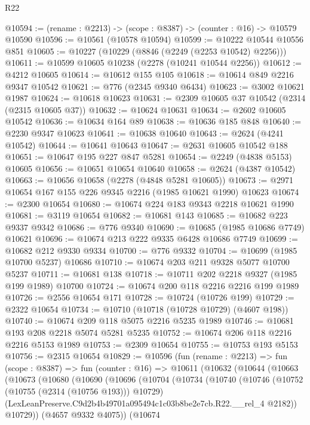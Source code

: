 \begin{lexlean}{R22}
\begin{coremodule}
@10594 := (rename : @2213) -> (scope : @8387) -> (counter : @16) -> @10579 @10590
@10596 := @10561 (@10578 @10594)
@10599 := @10222 @10544 @10556 @851
@10605 := @10227 (@10229 (@8846 (@2249 (@2253 @10542) @2256)))
@10611 := @10599 @10605 @10238 (@2278 (@10241 @10544 @2256))
@10612 := @4212 @10605
@10614 := @10612 @155 @105
@10618 := @10614 @849 @2216 @9347 @10542
@10621 := @776 (@2345 @9340 @6434)
@10623 := @3002 @10621 @1987
@10624 := @10618 @10623
@10631 := @2309 @10605 @37 @10542 (@2314 (@2315 @10605 @37))
@10632 := @10624 @10631
@10634 := @2602 @10605 @10542
@10636 := @10634 @164 @89
@10638 := @10636 @185 @848
@10640 := @2230 @9347 @10623
@10641 := @10638 @10640
@10643 := @2624 (@4241 @10542)
@10644 := @10641 @10643
@10647 := @2631 @10605 @10542 @188
@10651 := @10647 @195 @227 @847 @5281
@10654 := @2249 (@4838 @5153) @10605
@10656 := @10651 @10654 @10640
@10658 := @2624 (@4387 @10542)
@10663 := @10656 @10658 (@2278 (@4848 @5281 @10605))
@10673 := @2971 @10654 @167 @155 @226 @9345 @2216 (@1985 @10621 @1990) @10623
@10674 := @2300 @10654
@10680 := @10674 @224 @183 @9343 @2218 @10621 @1990
@10681 := @3119 @10654
@10682 := @10681 @143
@10685 := @10682 @223 @9337 @9342
@10686 := @776 @9340
@10690 := @10685 (@1985 @10686 @7749) @10621
@10696 := @10674 @213 @222 @9335 @6428 @10686 @7749
@10699 := @10682 @212 @9330 @9334
@10700 := @776 @9332
@10704 := @10699 (@1985 @10700 @5237) @10686
@10710 := @10674 @203 @211 @9328 @5077 @10700 @5237
@10711 := @10681 @138
@10718 := @10711 @202 @2218 @9327 (@1985 @199 @1989) @10700
@10724 := @10674 @200 @118 @2216 @2216 @199 @1989
@10726 := @2556 @10654 @171
@10728 := @10724 (@10726 @199)
@10729 := @2322 @10654
@10734 := @10710 (@10718 (@10728 @10729) (@4607 @198))
@10740 := @10674 @209 @118 @5075 @2216 @5235 @1989
@10746 := @10681 @193 @208 @2218 @5074 @5281 @5235
@10752 := @10674 @206 @118 @2216 @2216 @5153 @1989
@10753 := @2309 @10654
@10755 := @10753 @193 @5153
@10756 := @2315 @10654
@10829 := @10596
    (fun (rename : @2213) =>
    fun (scope : @8387) =>
    fun (counter : @16) =>
    @10611
      (@10632
        (@10644
          (@10663
            (@10673
              (@10680
                (@10690
                  (@10696
                    (@10704
                      (@10734
                        (@10740
                          (@10746
                            (@10752 (@10755 (@2314 (@10756 @193))) @10729)
                            (LexLeanPreserve.C9d2b4b49701a095494c1c03b8be2e7cb.R22.__rel_4 @2182))
                          @10729))
                      (@4657 @9332 @4075))
                    (@10674

\end{coremodule}
\end{lexlean}

